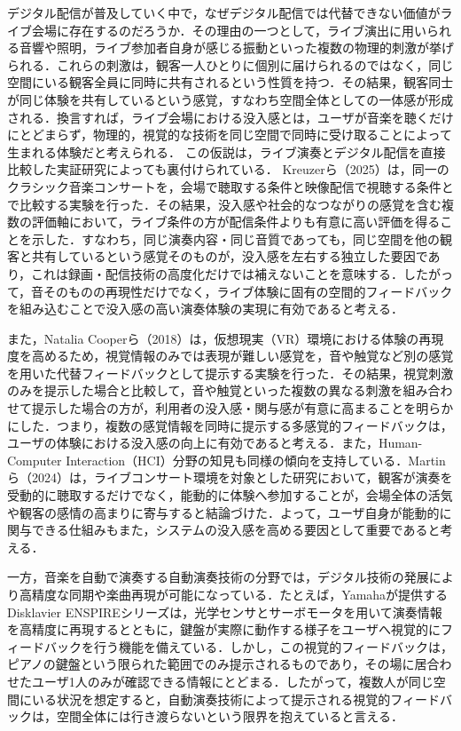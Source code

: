 デジタル配信が普及していく中で，なぜデジタル配信では代替できない価値がライブ会場に存在するのだろうか．その理由の一つとして，ライブ演出に用いられる音響や照明，ライブ参加者自身が感じる振動といった複数の物理的刺激が挙げられる．これらの刺激は，観客一人ひとりに個別に届けられるのではなく，同じ空間にいる観客全員に同時に共有されるという性質を持つ．その結果，観客同士が同じ体験を共有しているという感覚，すなわち空間全体としての一体感が形成される．換言すれば，ライブ会場における没入感とは，ユーザが音楽を聴くだけにとどまらず，物理的，視覚的な技術を同じ空間で同時に受け取ることによって生まれる体験だと考えられる．
この仮説は，ライブ演奏とデジタル配信を直接比較した実証研究によっても裏付けられている．
Kreuzerら（2025）は，同一のクラシック音楽コンサートを，会場で聴取する条件と映像配信で視聴する条件とで比較する実験を行った．その結果，没入感や社会的なつながりの感覚を含む複数の評価軸において，ライブ条件の方が配信条件よりも有意に高い評価を得ることを示した\cite{Kreuzer2025}．すなわち，同じ演奏内容・同じ音質であっても，同じ空間を他の観客と共有しているという感覚そのものが，没入感を左右する独立した要因であり，これは録画・配信技術の高度化だけでは補えないことを意味する．したがって，音そのものの再現性だけでなく，ライブ体験に固有の空間的フィードバックを組み込むことで没入感の高い演奏体験の実現に有効であると考える．

また，Natalia Cooperら（2018）は，仮想現実（VR）環境における体験の再現度を高めるため，視覚情報のみでは表現が難しい感覚を，音や触覚など別の感覚を用いた代替フィードバックとして提示する実験を行った．その結果，視覚刺激のみを提示した場合と比較して，音や触覚といった複数の異なる刺激を組み合わせて提示した場合の方が，利用者の没入感・関与感が有意に高まることを明らかにした\cite{Natalia2018}．つまり，複数の感覚情報を同時に提示する多感覚的フィードバックは，ユーザの体験における没入感の向上に有効であると考える．また，Human-Computer Interaction（HCI）分野の知見も同様の傾向を支持している．Martinら（2024）は，ライブコンサート環境を対象とした研究において，観客が演奏を受動的に聴取するだけでなく，能動的に体験へ参加することが，会場全体の活気や観客の感情の高まりに寄与すると結論づけた\cite{Martin}．よって，ユーザ自身が能動的に関与できる仕組みもまた，システムの没入感を高める要因として重要であると考える．

一方，音楽を自動で演奏する自動演奏技術の分野では，デジタル技術の発展により高精度な同期や楽曲再現が可能になっている．たとえば，Yamahaが提供するDisklavier ENSPIREシリーズは，光学センサとサーボモータを用いて演奏情報を高精度に再現するとともに，鍵盤が実際に動作する様子をユーザへ視覚的にフィードバックを行う機能を備えている\cite{yamaha}．しかし，この視覚的フィードバックは，ピアノの鍵盤という限られた範囲でのみ提示されるものであり，その場に居合わせたユーザ1人のみが確認できる情報にとどまる．したがって，複数人が同じ空間にいる状況を想定すると，自動演奏技術によって提示される視覚的フィードバックは，空間全体には行き渡らないという限界を抱えていると言える．

